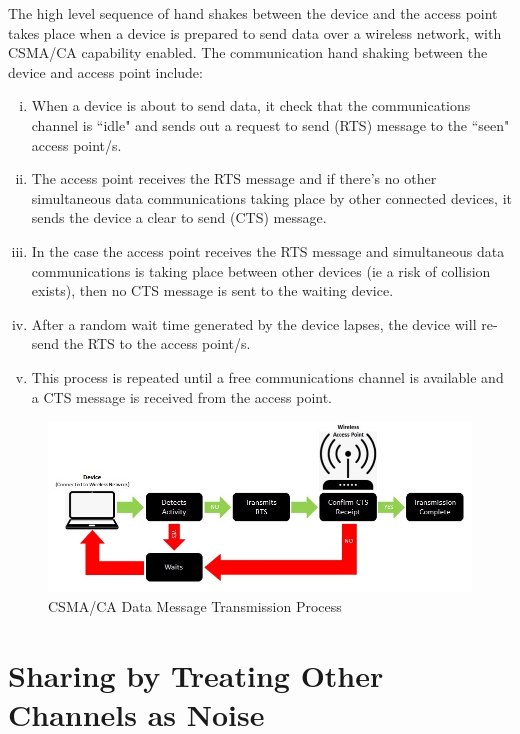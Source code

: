 The high level sequence of hand shakes between the device and the access
point takes place when a device is  prepared to send data over a wireless
network, with CSMA/CA capability enabled. The communication hand shaking
between the device and access point include:

\begin{enumerate}[(i)]

\item When a device is about to send data, it check that the communications 
channel is ``idle" and sends out a request to send (RTS) message to the ``seen" access point/s.
\item The access point receives the RTS message and if there's no other 
simultaneous data communications taking place by other connected devices, 
it sends the device a clear to send (CTS) message.
\item In the case the access point receives the RTS message and simultaneous 
data communications is taking place between other devices (ie a risk of collision 
exists), then no CTS message is sent to the waiting device.
\item After a random wait time generated by the device lapses, the 
device will re-send the RTS to the access point/s.
\item This process is repeated until a free communications channel is 
available and a CTS message is received from the access point.

\end{enumerate}

\begin{figure}
\centering
	\includegraphics[width=12cm]{CSMA_CA}
	\caption{CSMA/CA Data Message Transmission Process}
	\label{CSMA_CA}
\end{figure}


\section{Sharing by Treating Other Channels as Noise}\label{sharingasnoise}

